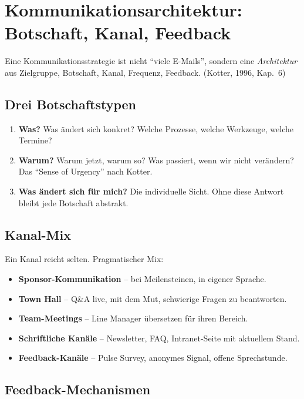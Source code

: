 \documentclass[11pt,a4paper,oneside]{article}
\newcommand{\fachbegriff}[1]{\textbf{#1}}
\newcommand{\quelle}[1]{{\footnotesize\color{lpGray}(#1)}}
\begin{document}
\section{Kommunikationsarchitektur: Botschaft, Kanal, Feedback}

Eine Kommunikationsstrategie ist nicht ``viele E-Mails'', sondern eine \emph{Architektur} aus Zielgruppe, Botschaft, Kanal, Frequenz, Feedback. \quelle{Kotter, 1996, Kap.~6}

\subsection{Drei Botschaftstypen}

\begin{enumerate}
  \item \fachbegriff{Was?} Was ändert sich konkret? Welche Prozesse, welche Werkzeuge, welche Termine?
  \item \fachbegriff{Warum?} Warum jetzt, warum so? Was passiert, wenn wir nicht verändern? Das ``Sense of Urgency'' nach Kotter.
  \item \fachbegriff{Was ändert sich für mich?} Die individuelle Sicht. Ohne diese Antwort bleibt jede Botschaft abstrakt.
\end{enumerate}

\subsection{Kanal-Mix}

Ein Kanal reicht selten. Pragmatischer Mix:

\begin{itemize}
  \item \textbf{Sponsor-Kommunikation} -- bei Meilensteinen, in eigener Sprache.
  \item \textbf{Town Hall} -- Q\&A live, mit dem Mut, schwierige Fragen zu beantworten.
  \item \textbf{Team-Meetings} -- Line Manager übersetzen für ihren Bereich.
  \item \textbf{Schriftliche Kanäle} -- Newsletter, FAQ, Intranet-Seite mit aktuellem Stand.
  \item \textbf{Feedback-Kanäle} -- Pulse Survey, anonymes Signal, offene Sprechstunde.
\end{itemize}

\subsection{Feedback-Mechanismen}
\end{document}
